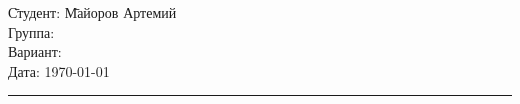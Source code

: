 \begin{tabbing}
	\hspace{11cm} \= Студент: \= Майоров Артемий \\	%
	\> Группа:  \\	%
	\> Вариант:  \\		%
	\> Дата: \> \today		%
\end{tabbing}
\hrule
\vspace{1cm}